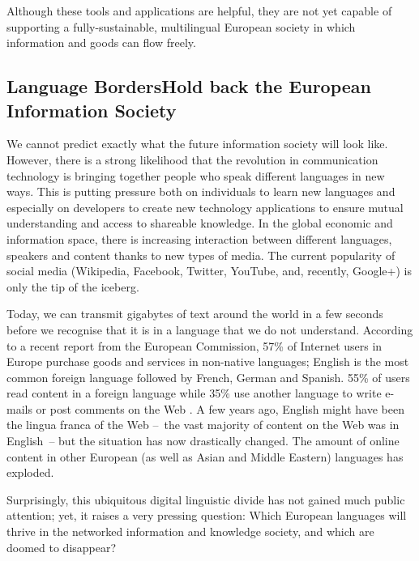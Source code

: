 \begin{multicols}{2}
Although these tools and applications are helpful, they are not yet capable of supporting a fully-sustainable, multilingual European society in which information and goods can flow freely.

\subsection[Language Borders Hold back the European Information Society]{Language Borders\newline Hold back the European Information Society}

We cannot predict exactly what the future information society will look like. However, there is a strong likelihood that the revolution in communication technology is bringing together people who speak different languages in new ways. This is putting pressure both on individuals to learn new languages and especially on developers to create new technology applications to ensure mutual understanding and access to shareable knowledge. In the global economic and information space, there is increasing interaction between different languages, speakers and content thanks to new types of media. The current popularity of social media (Wikipedia, Facebook, Twitter, YouTube, and, recently, Google+) is only the tip of the iceberg.


Today, we can transmit gigabytes of text around the world in a few seconds before we recognise that it is in a language that we do not understand. According to a recent report from the European Commission, 57\% of Internet users in Europe purchase goods and services in non-native languages; English is the most common foreign language followed by French, German and Spanish. 55\% of users read content in a foreign language while 35\% use another language to write e-mails or post comments on the Web \cite{EC1}. A few years ago, English might have been the lingua franca of the Web --~the vast majority of content on the Web was in English~-- but the situation has now drastically changed. The amount of online content in other European (as well as Asian and Middle Eastern) languages has exploded.

Surprisingly, this ubiquitous digital linguistic divide has not gained much public attention; yet, it raises a very pressing question: Which European languages will thrive in the networked information and knowledge society, and which are doomed to disappear?


\end{multicols}
